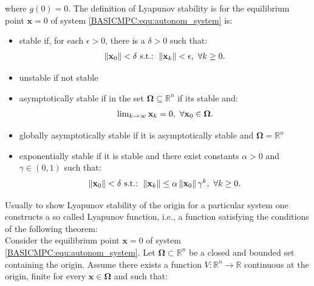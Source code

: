     where $g(0)=0$. The definition of Lyapunov stability is for the equilibrium point $\textbf{x}=0$ of system \ref{BASICMPC:equ:autonom_system} is:
    \begin{itemize}
    \item stable if, for each $\epsilon>0$, there is a $\delta>0$ such that:
        \begin{equation}
        \begin{array}{c}
                \left\lVert\textbf{x}_0\right\rVert<\delta\textnormal{ s.t.: }\left\lVert\textbf{x}_k\right\rVert<\epsilon,\textnormal{ }\forall k\geq0.
            \end{array}
            \label{BASICMPC:equ:lyapunov_1}
        \end{equation}

    \item unstable if not stable

    \item asymptotically stable if in the set $\boldsymbol{\Omega}\subseteq\mathbb{R}^n$ if its stable and:
       \begin{equation}
        \begin{array}{c}
                \lim_{k\rightarrow\infty}\textbf{x}_k=0,\textnormal{ }\forall\textbf{x}_0\in\boldsymbol{\Omega}.
            \end{array}
            \label{BASICMPC:equ:lyapunov_2}
        \end{equation}

    \item globally asymptotically stable if it is asymptotically stable and $\boldsymbol{\Omega}=\mathbb{R}^n$

    \item exponentially stable if it is stable and there exist constants $\alpha>0$ and $\gamma\in(0,1)$ such that:
    \begin{equation}
        \begin{array}{c}
                \left\lVert\textbf{x}_0\right\rVert<\delta\textnormal{ s.t.: }\left\lVert\textbf{x}_k\right\rVert\leq\alpha\left\lVert\textbf{x}_0\right\rVert\gamma^k,\textnormal{ }\forall k\geq0.
            \end{array}
            \label{BASICMPC:equ:lyapunov_3}
        \end{equation}


    \end{itemize}

    Usually to show Lyapunov stability of the origin for a particular system one constructs a so called Lyapunov function, i.e., a function satisfying the conditions of the following theorem:\\
    Consider the equilibrium point $\textbf{x}=0$ of system \ref{BASICMPC:equ:autonom_system}. Let $\boldsymbol{\Omega}\subset\mathbb{R}^n$ be a closed and bounded set containing the origin. Assume there exists a function $V:\mathbb{R}^n\rightarrow\mathbb{R}$ continuous at the origin, finite for every $\textbf{x}\in\boldsymbol{\Omega}$ and such that:

